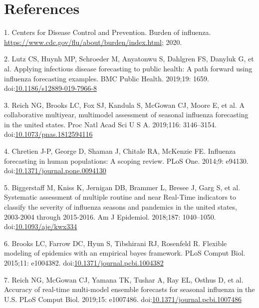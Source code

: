 \documentclass[10pt,letterpaper]{article}
\begin{document}
\hypertarget{references}{%
\section{References}\label{references}}



\hypertarget{refs}{}
\leavevmode\hypertarget{ref-Centers_for_Disease_Control_and_Prevention2020-uc}{}%
1. Centers for Disease Control and Prevention. Burden of influenza.
\url{https://www.cdc.gov/flu/about/burden/index.html}; 2020.

\leavevmode\hypertarget{ref-Lutz2019-co}{}%
2. Lutz CS, Huynh MP, Schroeder M, Anyatonwu S, Dahlgren FS, Danyluk G,
et al. Applying infectious disease forecasting to public health: A path
forward using influenza forecasting examples. BMC Public Health.
2019;19: 1659.
doi:\href{https://doi.org/10.1186/s12889-019-7966-8}{10.1186/s12889-019-7966-8}

\leavevmode\hypertarget{ref-Reich2019-uk}{}%
3. Reich NG, Brooks LC, Fox SJ, Kandula S, McGowan CJ, Moore E, et al. A
collaborative multiyear, multimodel assessment of seasonal influenza
forecasting in the united states. Proc Natl Acad Sci U S A. 2019;116:
3146--3154.
doi:\href{https://doi.org/10.1073/pnas.1812594116}{10.1073/pnas.1812594116}

\leavevmode\hypertarget{ref-Chretien2014-dy}{}%
4. Chretien J-P, George D, Shaman J, Chitale RA, McKenzie FE. Influenza
forecasting in human populations: A scoping review. PLoS One. 2014;9:
e94130.
doi:\href{https://doi.org/10.1371/journal.pone.0094130}{10.1371/journal.pone.0094130}

\leavevmode\hypertarget{ref-Biggerstaff2018-ns}{}%
5. Biggerstaff M, Kniss K, Jernigan DB, Brammer L, Bresee J, Garg S, et
al. Systematic assessment of multiple routine and near Real-Time
indicators to classify the severity of influenza seasons and pandemics
in the united states, 2003-2004 through 2015-2016. Am J Epidemiol.
2018;187: 1040--1050.
doi:\href{https://doi.org/10.1093/aje/kwx334}{10.1093/aje/kwx334}

\leavevmode\hypertarget{ref-Brooks2015-fl}{}%
6. Brooks LC, Farrow DC, Hyun S, Tibshirani RJ, Rosenfeld R. Flexible
modeling of epidemics with an empirical bayes framework. PLoS Comput
Biol. 2015;11: e1004382.
doi:\href{https://doi.org/10.1371/journal.pcbi.1004382}{10.1371/journal.pcbi.1004382}

\leavevmode\hypertarget{ref-Reich2019-ca}{}%
7. Reich NG, McGowan CJ, Yamana TK, Tushar A, Ray EL, Osthus D, et al.
Accuracy of real-time multi-model ensemble forecasts for seasonal
influenza in the U.S. PLoS Comput Biol. 2019;15: e1007486.
doi:\href{https://doi.org/10.1371/journal.pcbi.1007486}{10.1371/journal.pcbi.1007486}
\end{document}
